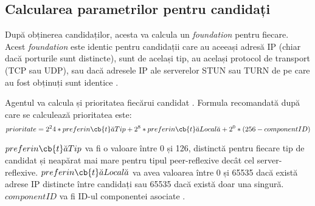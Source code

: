 \subsection{Calcularea parametrilor pentru candidați}
\indent \par După obținerea candidaților, acesta va calcula un \textit{foundation} pentru fiecare. Acest \textit{foundation} este identic pentru candidații care au aceeași adresă IP (chiar dacă porturile sunt distincte), sunt de același tip, au același protocol de transport (TCP sau UDP), sau dacă adresele IP ale serverelor STUN sau TURN de pe care au fost obținuți sunt identice \cite{rfc8445}.
\indent \par Agentul va calcula și prioritatea fiecărui candidat \cite{rfc8445}. Formula recomandată după care se calculează prioritatea este:
\[prioritate = 2^24 * preferin\cb{t}\breve{a}Tip + 2^8 * preferin\cb{t}\breve{a}Local\breve{a} + 2^0 * (256 - componentID)\]
\par \(preferin\cb{t}\breve{a}Tip\) va fi o valoare între 0 și 126, distinctă pentru fiecare tip de candidat și neapărat mai mare pentru tipul peer-reflexive decât cel server-reflexive. \(preferin\cb{t}\breve{a}Local\breve{a}\) va avea valoarea între 0 și 65535 dacă există adrese IP distincte între candidați sau 65535 dacă există doar una singură. \(componentID\) va fi ID-ul componentei asociate \cite{rfc8445}.
